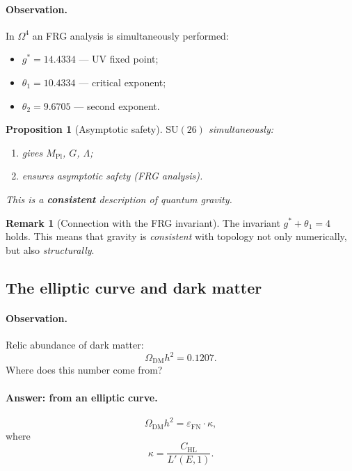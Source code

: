 \documentclass[11pt,a4paper]{article}
\newcommand{\SU}{\mathrm{SU}}
\newcommand{\Om}{\Omega^4}
\newcommand{\Mpl}{M_{\text{Pl}}}
\newcommand{\epsFN}{\varepsilon_{\text{FN}}}
\newtheorem{proposition}[theorem]{Proposition}
\theoremstyle{definition}
\newtheorem{remark}[theorem]{Remark}
\begin{document}
\paragraph{Observation.}
In $\Om$ an FRG analysis is simultaneously performed:
\begin{itemize}
    \item $g^* = 14.4334$ — UV fixed point;
    \item $\theta_1 = 10.4334$ — critical exponent;
    \item $\theta_2 = 9.6705$ — second exponent.
\end{itemize}

\begin{proposition}[Asymptotic safety]
\label{prop:asymptotic-safety}
$\SU(26)$ simultaneously:
\begin{enumerate}
    \item gives $\Mpl$, $G$, $\Lambda$;
    \item ensures asymptotic safety 
          (FRG analysis).
\end{enumerate}
This is a \textbf{consistent} description of quantum gravity.
\end{proposition}

\begin{remark}[Connection with the FRG invariant]
\label{rem:frg-invariant-link}
The invariant $g^* + \theta_1 = 4$ holds. This means 
that gravity is \emph{consistent} with topology not only 
numerically, but also \emph{structurally}.
\end{remark}

\subsection{The elliptic curve and dark matter}
\label{subsec:elliptic-curve}

\paragraph{Observation.}
Relic abundance of dark matter:
\begin{equation}
    \Omega_{\text{DM}} h^2 = 0.1207.
\end{equation}
Where does this number come from?

\paragraph{Answer: from an elliptic curve.}
\begin{equation}
    \boxed{
    \Omega_{\text{DM}} h^2 = \epsFN \cdot \kappa,
    }
    \label{eq:omega-dm-kappa}
\end{equation}
where
\begin{equation}
    \kappa = \frac{C_{\text{HL}}}{L'(E,1)}.
    \label{eq:kappa}
\end{equation}
\end{document}
